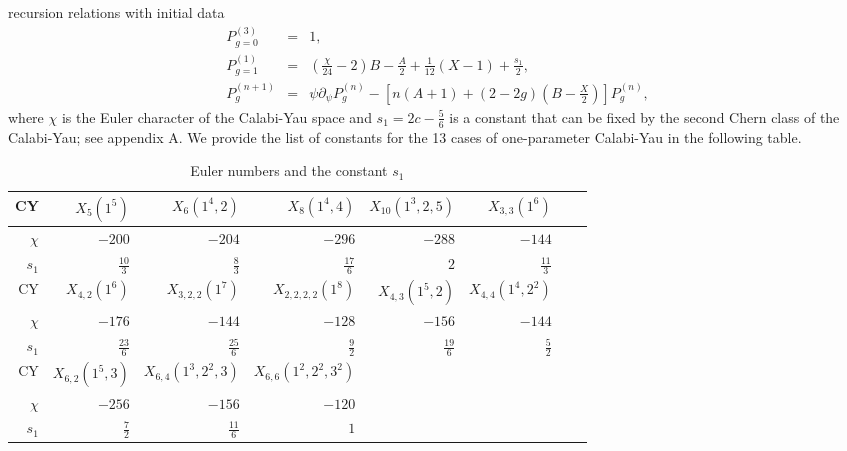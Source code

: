\documentclass[12pt]{article}
\begin{document}
recursion relations with initial data
\begin{eqnarray}
P^{(3)}_{g=0}&=&1, \nonumber \\
P^{(1)}_{g=1} &=&
(\frac{\chi}{24}-2)B-\frac{A}{2}+\frac{1}{12}(X-1)+\frac{s_1}{2},
\nonumber \\
P^{(n+1)}_g &=& \psi\partial_\psi
P^{(n)}_g-[n(A+1)+(2-2g)(B-\frac{X}{2})]P^{(n)}_g,
\end{eqnarray}
where $\chi$ is the Euler character of the Calabi-Yau space and
$s_1=2 c-\frac{5}{6}$ is a constant that can be fixed by the
second Chern class of the Calabi-Yau; see appendix A. We provide
the list of constants for the 13 cases of one-parameter Calabi-Yau
in the following table.

\begin{table}
\begin{centering}
\begin{tabular}{|r|r|r|r|r|r|r|r|}
\hline CY &$X_5(1^5)$ & $X_6(1^4,2)$ & $X_8(1^4,4)$ &
$X_{10}(1^3,2,5)$ & $X_{3,3}(1^6)$
\\ \hline
$\chi$ & $-200$ & $-204$ & $-296$ & $-288$ & $-144$ \\
\hline $s_1$ & $\frac{10}{3}$ & $\frac{8}{3}$ & $\frac{17}{6}$ &
$2$ & $\frac{11}{3}$ \\ \hline CY & $X_{4,2}(1^6)$ &
$X_{3,2,2}(1^7)$ &$X_{2,2,2,2}(1^8)$ & $X_{4,3}(1^5,2)$ &
$X_{4,4}(1^4,2^2)$  \\ \hline $\chi$ & $-176$ & $-144$  & $-128$ &
$-156$ & $-144$  \\ \hline $s_1$  & $\frac{23}{6}$ &
$\frac{25}{6}$ & $\frac{9}{2}$ & $\frac{19}{6}$ & $\frac{5}{2}$ \\
\hline CY & $X_{6,2}(1^5,3)$ & $X_{6,4}(1^3,2^2,3)$ &
$X_{6,6}(1^2,2^2,3^2)$ & &\\ \hline  $\chi$ & $-256$ & $-156$ &
$-120$  &
&\\ \hline  $s_1$ & $\frac{7}{2}$ & $\frac{11}{6}$ & $1$  & & \\
\hline
\end{tabular} \caption{Euler numbers and the constant $s_1$}
\end{centering}
\end{table}
\end{document}
